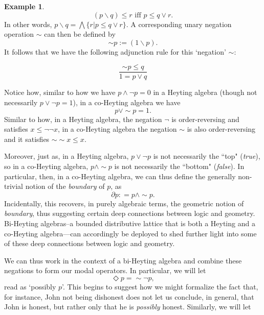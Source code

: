 \documentclass[a4paper]{book}
\theoremstyle{definition}
\newtheorem{example}{Example}[section]
\theoremstyle{definition}
\theoremstyle{definition}
\theoremstyle{theorem}
\theoremstyle{definition}
\begin{document}
\begin{example}
	\begin{equation*}
	(p \smallsetminus q) \leq r \text{ iff } p \leq q \vee r. 
	\end{equation*}
	In other words, $p \smallsetminus q = \bigwedge \{r | p \leq q \vee r \}$. 
	A corresponding unary negation operation $\sim$ can then be defined by 
	\begin{equation}
	\sim p := (1 \smallsetminus p). 
	\end{equation}	  
	It follows that we have the following adjunction rule for this `negation' $\sim$: 
	\begin{center} 
		\begin{equation*}
		\frac{\sim p \leq q}{1 =p \vee q}
		\end{equation*}
	\end{center} 
	Notice how, similar to how we have $p \wedge \neg p = 0$ in a Heyting algebra (though not necessarily $p \vee \neg p = 1$), in a co-Heyting algebra we have 
	\begin{equation*}
	p \vee \sim p = 1.
	\end{equation*}
	Similar to how, in a Heyting algebra, the negation $\neg$ is order-reversing and satisfies $x \leq \neg \neg x$, in a co-Heyting algebra the negation $\sim$ is also order-reversing and it satisfies $\sim \sim x \leq x$. \par   
	Moreover, just as, in a Heyting algebra, $p \vee \neg p$ is not necessarily the ``top" (\textit{true}), so in a co-Heyting algebra, $p \wedge \sim p$ is not necessarily the ``bottom" (\textit{false}). In particular, then, in a co-Heyting algebra, we can thus define the generally non-trivial notion of the \textit{boundary} of $p$, as 
	\begin{equation*}
	\partial p : = p \wedge \sim p. 
	\end{equation*}
	Incidentally, this recovers, in purely algebraic terms, the geometric notion of \textit{boundary}, thus suggesting certain deep connections between logic and geometry. 
	Bi-Heyting algebras--a bounded distributive lattice that is both a Heyting and a co-Heyting algebra---can accordingly be deployed to shed further light into some of these deep connections between logic and geometry. \par 
	We can thus work in the context of a bi-Heyting algebra and combine these negations to form our modal operators. In particular, we will let
	\begin{equation*} 
	\Diamond p = \sim \neg p,
	\end{equation*} read as `possibly $p$'. This begins to suggest how we might formalize the fact that, for instance, John not being dishonest does not let us conclude, in general, that John is honest, but rather only that he is \textit{possibly} honest. Similarly, we will let 

\end{example}
\end{document}
